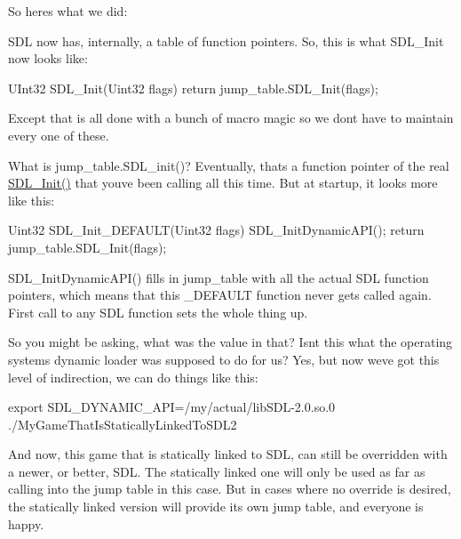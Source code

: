 So here\textquotesingle{}s what we did\+:

S\+DL now has, internally, a table of function pointers. So, this is what S\+D\+L\+\_\+\+Init now looks like\+: \begin{DoxyVerb}UInt32 SDL_Init(Uint32 flags)
{
    return jump_table.SDL_Init(flags);
}
\end{DoxyVerb}


Except that is all done with a bunch of macro magic so we don\textquotesingle{}t have to maintain every one of these.

What is jump\+\_\+table.\+S\+D\+L\+\_\+init()? Eventually, that\textquotesingle{}s a function pointer of the real \mbox{\hyperlink{_s_d_l_8h_a8fc8d35348d7c74bad8392d776c937b8}{S\+D\+L\+\_\+\+Init()}} that you\textquotesingle{}ve been calling all this time. But at startup, it looks more like this\+: \begin{DoxyVerb}Uint32 SDL_Init_DEFAULT(Uint32 flags)
{
    SDL_InitDynamicAPI();
    return jump_table.SDL_Init(flags);
}
\end{DoxyVerb}


S\+D\+L\+\_\+\+Init\+Dynamic\+A\+P\+I() fills in jump\+\_\+table with all the actual S\+DL function pointers, which means that this \+\_\+\+D\+E\+F\+A\+U\+LT function never gets called again. First call to any S\+DL function sets the whole thing up.

So you might be asking, what was the value in that? Isn\textquotesingle{}t this what the operating system\textquotesingle{}s dynamic loader was supposed to do for us? Yes, but now we\textquotesingle{}ve got this level of indirection, we can do things like this\+: \begin{DoxyVerb}export SDL_DYNAMIC_API=/my/actual/libSDL-2.0.so.0
./MyGameThatIsStaticallyLinkedToSDL2
\end{DoxyVerb}


And now, this game that is statically linked to S\+DL, can still be overridden with a newer, or better, S\+DL. The statically linked one will only be used as far as calling into the jump table in this case. But in cases where no override is desired, the statically linked version will provide its own jump table, and everyone is happy.

